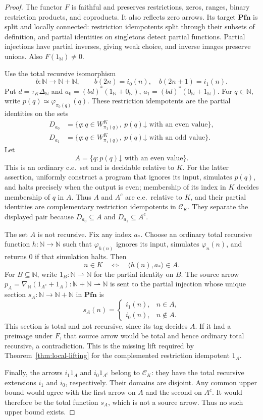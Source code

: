 \documentclass[11pt]{article}
\newcommand{\N}{\mathbb N}
\newcommand{\Pfn}{\mathbf{Pfn}}
\begin{document}
\begin{proof}
The functor $F$ is faithful and preserves restrictions, zeros,
ranges, binary restriction products, and coproducts. It also reflects
zero arrows. Its target $\Pfn$ is split and locally connected:
restriction idempotents split through their subsets of definition,
and partial identities on singletons detect partial functions.
Partial injections have partial inverses, giving weak choice, and
inverse images preserve unions. Also $F(1_{\N})\ne0$.

Use the total recursive isomorphism
\[
 b:\N\longrightarrow\N+\N,\qquad
 b(2n)=i_0(n),\quad b(2n+1)=i_1(n).
\]
Put $d=\tau_K\Delta_{\N}$ and
$a_0=(bd)^*(1_{\N}+0_{\N})$,
$a_1=(bd)^*(0_{\N}+1_{\N})$.
For $q\in\N$, write
$p(q)\simeq\varphi_{\pi_0(q)}(q)$. These restriction idempotents
are the partial identities on the sets
\[
 \begin{aligned}
 D_{a_0}&=\{q:q\in W_{\pi_1(q)}^K,
                    \ p(q)\mathord\downarrow\text{ with an even value}\},\\
 D_{a_1}&=\{q:q\in W_{\pi_1(q)}^K,
                    \ p(q)\mathord\downarrow\text{ with an odd value}\}.
 \end{aligned}
\]
Let
\[
 A=\{q:p(q)\mathord\downarrow\text{ with an even value}\}.
\]
This is an ordinary c.e.\ set and is decidable relative to $K$.
For the latter assertion, uniformly construct a program that ignores
its input, simulates $p(q)$, and halts precisely when the output is
even; membership of its index in $K$ decides membership of $q$ in $A$.
Thus $A$ and $A^c$ are c.e.\ relative to $K$, and their partial
identities are complementary restriction idempotents in $\mathcal C_K$.
They separate the displayed pair because
$D_{a_0}\subseteq A$ and $D_{a_1}\subseteq A^c$.

The set $A$ is not recursive. Fix any index $a_*$. Choose an ordinary
total recursive function $h:\N\to\N$ such that $\varphi_{h(n)}$
ignores its input, simulates $\varphi_n(n)$, and returns $0$ if that
simulation halts. Then
\[
 n\in K\quad\Longleftrightarrow\quad
 \langle h(n),a_*\rangle\in A.
\]
For $B\subseteq\N$, write $1_B:\N\rightharpoonup\N$ for the
partial identity on $B$. The source arrow
$p_A=\nabla_{\N}(1_{A^c}+1_A):\N+\N\rightharpoonup\N$
is sent to the partial injection whose unique section
$s_A:\N\to\N+\N$ in $\Pfn$ is
\[
 s_A(n)=
 \begin{cases}
  i_1(n),&n\in A,\\
  i_0(n),&n\notin A.
 \end{cases}
\]
This section is total and not recursive, since its tag decides $A$.
If it had a preimage under $F$, that source arrow would
be total and hence ordinary total recursive, a contradiction.
This is the missing lift required by
Theorem~\ref{thm:local-lifting} for the complemented restriction idempotent $1_A$.

Finally, the arrows $i_1 1_A$ and $i_0 1_{A^c}$ belong to
$\mathcal C_K$: they have the total recursive extensions $i_1$
and $i_0$, respectively. Their domains are disjoint. Any common
upper bound would agree with the first arrow on $A$ and the second
on $A^c$. It would therefore be the total function $s_A$, which
is not a source arrow. Thus no such upper bound exists.
\end{proof}
\end{document}

